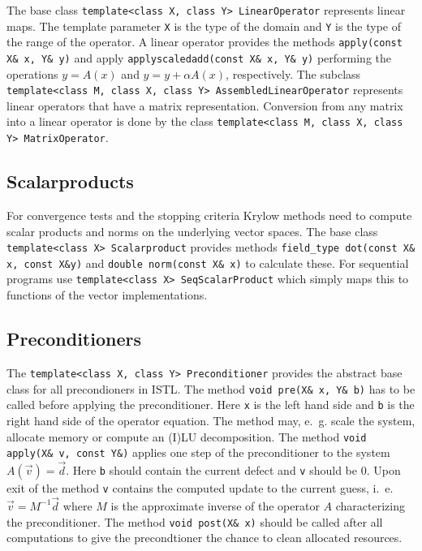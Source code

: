 \documentclass[11pt]{article}
\begin{document}
{\lstset{breaklines=true}
The base class
\lstinline!template<class X, class Y> LinearOperator! represents
linear maps. The 
template parameter \lstinline!X! is the type of the domain and
\lstinline!Y! is the type of the range of the operator.  A linear
operator provides the methods \lstinline!apply(const X& x, Y& y)! and 
apply \lstinline!applyscaledadd(const X& x, Y& y)! performing the
operations $y = A(x)$ and $y = y + \alpha A(x)$, respectively.
The subclass 
\lstinline!template<class M, class X, class Y> AssembledLinearOperator!
represents linear operators that have a matrix
representation. Conversion from any matrix into a linear operator is
done by the class 
\lstinline!template<class M, class X, class Y> MatrixOperator!.

\subsection{Scalarproducts}
\label{sec:scalarproducts}

For convergence tests and the stopping criteria Krylow methods need to
compute scalar products and norms on the underlying vector spaces. The
base class \lstinline!template<class X> Scalarproduct! provides
methods \lstinline!field_type dot(const X& x, const X&y)! and
\lstinline!double norm(const X& x)! to calculate these. For
sequential programs use 
\lstinline!template<class X> SeqScalarProduct! which simply maps this
to functions of the vector implementations.

\subsection{Preconditioners}
\label{sec:preconditioners}


The \lstinline!template<class X, class Y> Preconditioner! provides the
abstract base class for all precondioners in ISTL. The method
\lstinline!void pre(X& x, Y& b)! has to be called before applying the
preconditioner. Here \lstinline!x! is the left hand side and
\lstinline!b! is the right hand side of the operator equation. The
method may, e.~g. scale the system, allocate memory or compute an (I)LU
decomposition. The method \lstinline!void apply(X& v, const Y&)!
applies one step of the preconditioner to the system $A(\vec v)=\vec d$.
Here \lstinline!b! should contain the current defect and
\lstinline!v! should be $0$. Upon exit of the method \lstinline!v!
contains the computed update to
the current guess, i.~e. $\vec v = M^{-1} \vec
d$ where $M$ is the approximate inverse of the operator $A$
characterizing the preconditioner. The method \lstinline!void post(X& x)!
should be called after all computations to give the precondtioner the
chance to clean allocated resources. 

}
\end{document}
